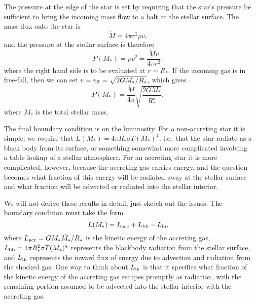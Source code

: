 The pressure at the edge of the star is set by requiring that the star's pressure be sufficient to bring the incoming mass flow to a halt at the stellar surface. The mass flux onto the star is
\begin{equation}
\dot{M} = 4\pi r^2 \rho v,
\end{equation}
and the pressure at the stellar surface is therefore
\begin{equation}
P(M_*) = \rho v^2 = \frac{\dot{M} v}{4\pi r^2},
\end{equation}
where the right hand side is to be evaluated at $r=R_*$. If the incoming gas is in free-fall, then we can set $v = v_{\rm ff} = \sqrt{2GM_*/R_*}$, which gives
\begin{equation}
\label{pbound1}
P(M_*) = \frac{\dot{M}}{4\pi} \sqrt{\frac{2 G M_*}{R_*^5}},
\end{equation}
where $M_*$ is the total stellar mass. 

The final boundary condition is on the luminosity. For a non-accreting star it is simple: we require that $L(M_*)=4\pi R_* \sigma T(M_*)^4$, i.e.\ that the star radiate as a black body from its surface, or something somewhat more complicated involving a table lookup of a stellar atmosphere. For an accreting star it is more complicated, however, because the accreting gas carries energy, and the question becomes what fraction of this energy will be radiated away at the stellar surface and what fraction will be advected or radiated into the stellar interior.

We will not derive these results in detail, just sketch out the issues. The boundary condition must take the form
\begin{equation}
\label{lbound1}
L(M_*) = L_{\rm acc} + L_{\rm bb} - L_{\rm in},
\end{equation}
where $L_{\rm acc}=G M_* \dot{M}_*/R_*$ is the kinetic energy of the accreting gas, $L_{\rm bb} = 4\pi R_*^2 \sigma T(M_*)^4$ represents the blackbody radiation from the stellar surface, and $L_{\rm in}$ represents the inward flux of energy due to advection and radiation from the shocked gas. One way to think about $L_{\rm in}$ is that it specifies what fraction of the kinetic energy of the accreting gas escapes promptly as radiation, with the remaining portion assumed to be advected into the stellar interior with the accreting gas.

